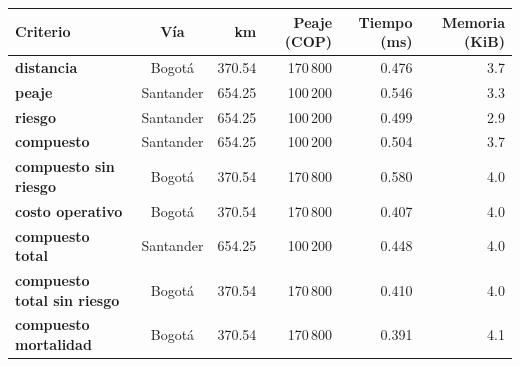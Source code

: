 \renewcommand{\arraystretch}{1.2}
\begin{tabular}{|l|c|r|r|r|r|}
\hline
\rowcolor{gray!20} \textbf{Criterio} & \textbf{Vía} & \textbf{km} & \textbf{Peaje (COP)} & \textbf{Tiempo (ms)} & \textbf{Memoria (KiB)} \\
\hline
\textbf{distancia} & Bogotá & 370.54 & 170\,800 & 0.476 & 3.7 \\
\hline
\textbf{peaje} & Santander & 654.25 & 100\,200 & 0.546 & 3.3 \\
\hline
\textbf{riesgo} & Santander & 654.25 & 100\,200 & 0.499 & 2.9 \\
\hline
\textbf{compuesto} & Santander & 654.25 & 100\,200 & 0.504 & 3.7 \\
\hline
\textbf{compuesto sin riesgo} & Bogotá & 370.54 & 170\,800 & 0.580 & 4.0 \\
\hline
\textbf{costo operativo} & Bogotá & 370.54 & 170\,800 & 0.407 & 4.0 \\
\hline
\textbf{compuesto total} & Santander & 654.25 & 100\,200 & 0.448 & 4.0 \\
\hline
\textbf{compuesto total sin riesgo} & Bogotá & 370.54 & 170\,800 & 0.410 & 4.0 \\
\hline
\textbf{compuesto mortalidad} & Bogotá & 370.54 & 170\,800 & 0.391 & 4.1 \\
\hline
\end{tabular}
